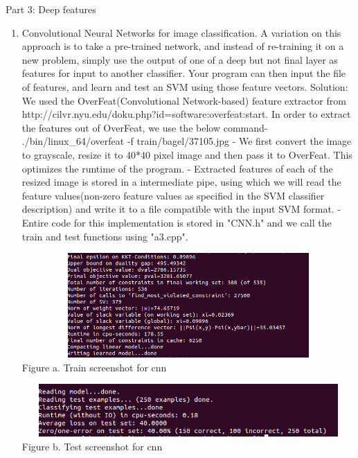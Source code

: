 \documentclass{article}
\begin{document}
	Part 3: Deep features
	\begin{enumerate}
		\item Convolutional Neural Networks for image classification. A variation on this approach is to take a pre-trained network, and instead of re-training it on a new problem, simply use the output of one of a deep but not final layer as features for input to another classifier. Your program can then input the file of
		features, and learn and test an SVM using those feature vectors. \newline \newline
		Solution: We used the OverFeat(Convolutional Network-based) feature extractor from http://cilvr.nyu.edu/doku.php?id=software:overfeat:start. In order to extract the features out of OverFeat, we use the below command- \newline \newline
		./bin/linux\_64/overfeat -f train/bagel/37105.jpg \newline \newline
		- We first convert the image to grayscale, resize it to 40*40 pixel image and then pass it to OverFeat. This optimizes the runtime of the program. \newline
		- Extracted features of each of the resized image is stored in a intermediate pipe, using which we will read the feature values(non-zero feature values as specified in the SVM classifier description) and write it to a file compatible with the input SVM format. \newline
		- Entire code for this implementation is stored in "CNN.h" and we call the train and test functions using "a3.cpp". \newline
		
		\begin{center}
			\includegraphics[width=14cm, height=4cm]{cnn_train.png} \\
			Figure a. Train screenshot for cnn
		\end{center}
		
		\begin{center}
			\includegraphics[width=14cm, height=2cm]{cnn_test.png} \\
			Figure b. Test screenshot for cnn
		\end{center}
		
	\end{enumerate}
\end{document}

